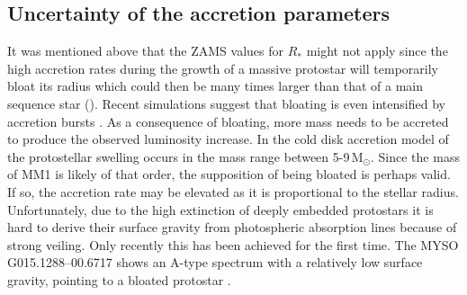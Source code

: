 
\subsection{Uncertainty of the accretion parameters}

It was mentioned above that the ZAMS values for $R_*$ might not apply since the high accretion rates during the growth of a massive protostar will temporarily bloat its radius which could then be many times larger than that of a main sequence star (\citealp{2009ApJ...691..823H, 2010ApJ...721..478H}).
Recent simulations suggest that bloating is even intensified by accretion bursts \citep{2019MNRAS.484.2482M}. 
As a consequence of bloating,
more mass needs to be accreted to produce the observed luminosity increase. 
In the cold disk accretion model of \citet{2010ApJ...721..478H} the protostellar swelling occurs in the mass range between 5-9\,M$_\odot$. Since the mass of MM1 is likely of that order, the supposition of being bloated is perhaps valid. If so, the accretion rate may be elevated as it is proportional to the stellar radius. Unfortunately, due to the high extinction of deeply embedded protostars it is hard to derive their surface gravity from photospheric absorption lines because of strong veiling. 
Only recently this has been achieved for the first time. The MYSO G015.1288--00.6717 shows an A-type spectrum with a relatively low surface gravity, pointing to a bloated protostar \citep{2017MNRAS.472.3624P}.

